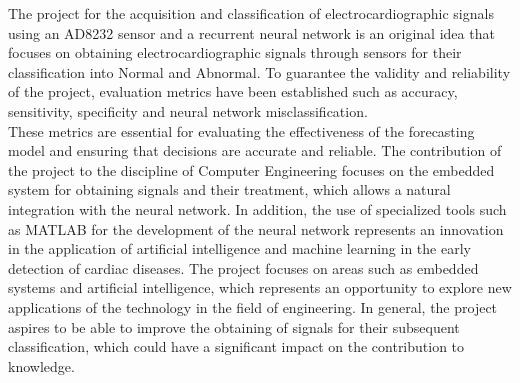 The project for the acquisition and classification of electrocardiographic signals using an AD8232 sensor and a recurrent neural network is an original idea that focuses on obtaining electrocardiographic signals through sensors for their classification into Normal and Abnormal. To guarantee the validity and reliability of the project, evaluation metrics have been established such as accuracy, sensitivity, specificity and neural network misclassification.\\ These metrics are essential for evaluating the effectiveness of the forecasting model and ensuring that decisions are accurate and reliable. The contribution of the project to the discipline of Computer Engineering focuses on the embedded system for obtaining signals and their treatment, which allows a natural integration with the neural network. In addition, the use of specialized tools such as MATLAB for the development of the neural network represents an innovation in the application of artificial intelligence and machine learning in the early detection of cardiac diseases.
The project focuses on areas such as embedded systems and artificial intelligence, which represents an opportunity to explore new applications of the technology in the field of engineering. In general, the project aspires to be able to improve the obtaining of signals for their subsequent classification, which could have a significant impact on the contribution to knowledge.


{}

